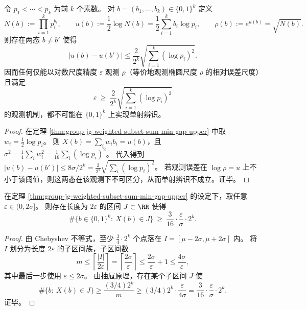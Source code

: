 \begin{corollary}\label{cor:group-jg-prime-register-logscale-indistinguishability-threshold}
令 \(p_1<\cdots<p_k\) 为前 \(k\) 个素数。
对 \(b=(b_1,\dots,b_k)\in\{0,1\}^k\) 定义
\[
N(b):=\prod_{i=1}^k p_i^{b_i},\qquad
u(b):=\frac12\log N(b)=\frac12\sum_{i=1}^k b_i\log p_i,
\qquad
\rho(b):=e^{u(b)}=\sqrt{N(b)}.
\]
则存在两态 \(b\neq b'\) 使得
\[
|u(b)-u(b')|
\le
\frac{2}{2^k}\sqrt{\sum_{i=1}^k (\log p_i)^2}.
\]
因而任何仅能以对数尺度精度 \(\varepsilon\) 观测 \(\rho\)（等价地观测椭圆尺度 \(\rho\) 的相对误差尺度）且满足
\[
\varepsilon\ \ge\ \frac{2}{2^k}\sqrt{\sum_{i=1}^k (\log p_i)^2}
\]
的观测机制，都不可能在 \(\{0,1\}^k\) 上实现单射辨识。
\end{corollary}
\begin{proof}
在定理 \ref{thm:group-jg-weighted-subset-sum-min-gap-upper} 中取 \(w_i=\frac12\log p_i\)。
则
\(
X(b)=\sum_i w_i b_i=u(b)
\)，且
\(
\sigma^2=\frac14\sum_i w_i^2=\frac{1}{16}\sum_i(\log p_i)^2
\)。
代入得到
\(
|u(b)-u(b')|\le 8\sigma/2^k
=\frac{2}{2^k}\sqrt{\sum_i(\log p_i)^2}
\)。
若观测误差在 \(\log\rho=u\) 上不小于该阈值，则这两态在该观测下不可区分，从而单射辨识不成立。证毕。
\end{proof}

\begin{theorem}[固定精度下的指数级多重度]\label{thm:group-jg-fixed-precision-exponential-multiplicity}
在定理 \ref{thm:group-jg-weighted-subset-sum-min-gap-upper} 的设定下，取任意 \(\varepsilon\in(0,2\sigma]\)。
则存在长度为 \(2\varepsilon\) 的区间 \(J\subset\RR\) 使得
\[
\#\{b\in\{0,1\}^k:\ X(b)\in J\}
\ \ge\
\frac{3}{16}\cdot \frac{\varepsilon}{\sigma}\cdot 2^k.
\]
\end{theorem}
\begin{proof}
由 Chebyshev 不等式，至少 \(\frac34\cdot 2^k\) 个点落在 \(I=[\mu-2\sigma,\mu+2\sigma]\) 内。
将 \(I\) 划分为长度 \(2\varepsilon\) 的子区间族，子区间数
\[
m\le \left\lceil\frac{|I|}{2\varepsilon}\right\rceil
=\left\lceil\frac{2\sigma}{\varepsilon}\right\rceil
\le \frac{2\sigma}{\varepsilon}+1\le \frac{4\sigma}{\varepsilon},
\]
其中最后一步使用 \(\varepsilon\le 2\sigma\)。
由抽屉原理，存在某个子区间 \(J\) 使
\[
\#\{b:\ X(b)\in J\}
\ge
\frac{(3/4)2^k}{m}
\ge
(3/4)2^k\cdot \frac{\varepsilon}{4\sigma}
=\frac{3}{16}\cdot\frac{\varepsilon}{\sigma}\cdot2^k.
\]
证毕。
\end{proof}

